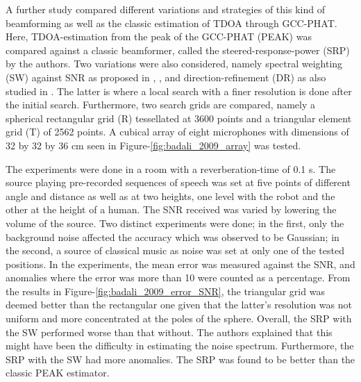 \documentclass[notitlepage]{report}
\begin{document}
A further study \cite{badali_evaluating_2009} compared different variations and strategies of this kind of beamforming as well as the classic estimation of TDOA through GCC-PHAT. Here, TDOA-estimation from the peak of the GCC-PHAT (PEAK) was compared against a classic beamformer, called the steered-response-power (SRP) by the authors. Two variations were also considered, namely spectral weighting (SW) against SNR as proposed in \cite{valin_robust_2003}, \cite{valin_localization_2004}, \cite{valin_robust_2007} and direction-refinement (DR) as also studied in \cite{valin_robust_2007}. The latter is where a local search with a finer resolution is done after the initial search. Furthermore, two search grids are compared, namely a spherical rectangular grid (R) tessellated at 3600 points and a triangular element grid (T) of 2562 points. A cubical array of eight microphones with dimensions of 32 by 32 by 36 \si{cm} seen in Figure-\ref{fig:badali_2009_array} was tested. 

The experiments were done in a room with a reverberation-time of 0.1 \si{s}. The source playing pre-recorded sequences of speech was set at five points of different angle and distance as well as at two heights, one level with the robot and the other at the height of a human. The SNR received was varied by lowering the volume of the source. Two distinct experiments were done; in the first, only the background noise affected the accuracy which was observed to be Gaussian; in the second, a source of classical music as noise was set at only one of the tested positions. In the experiments, the mean error was measured against the SNR, and anomalies where the error was more than 10 \si{\deg} were counted as a percentage. From the results in Figure-\ref{fig:badali_2009_error_SNR}, the triangular grid was deemed better than the rectangular one given that the latter's resolution was not uniform and more concentrated at the poles of the sphere. Overall, the SRP with the SW performed worse than that without. The authors explained that this might have been the difficulty in estimating the noise spectrum. Furthermore, the SRP with the SW had more anomalies. The SRP was found to be better than the classic PEAK estimator.
\end{document}
